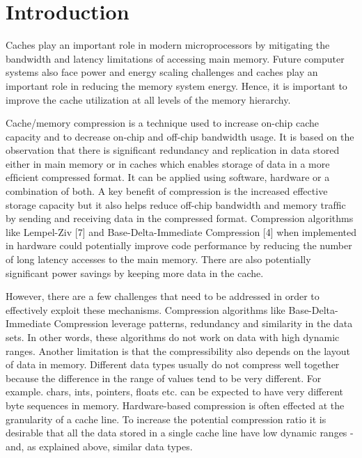 \section{Introduction}
\label{sec:intro}

Caches play an important role in modern microprocessors by mitigating the
bandwidth and latency limitations of accessing main memory. Future computer
systems also face power and energy scaling challenges and caches play an
important role in reducing the memory system energy. Hence, it is important to
improve the cache utilization at all levels of the memory hierarchy. 

Cache/memory compression is a technique used to increase on-chip cache capacity
and to decrease on-chip and off-chip bandwidth usage. It is based on the
observation that there is signiﬁcant redundancy and replication in data stored
either in main memory or in caches which enables storage of data in a more
efﬁcient compressed format. It can be applied using software, hardware or a
combination of both. A key beneﬁt of compression is the increased effective
storage capacity but it also helps reduce off-chip bandwidth and memory trafﬁc
by sending and receiving data in the compressed format. Compression algorithms
like Lempel-Ziv [7] and Base-Delta-Immediate Compression [4] when implemented in
hardware could potentially improve code performance by reducing the number of
long latency accesses to the main memory. There are also potentially significant
power savings by keeping more data in the cache. 

However, there are a few challenges that need to be addressed in order to
effectively exploit these mechanisms. Compression algorithms like
Base-Delta-Immediate Compression leverage patterns, redundancy and similarity in
the data sets. In other words, these algorithms do not work on data with high
dynamic ranges. Another limitation is that the compressibility also depends on
the layout of data in memory. Different data types usually do not compress well
together because the difference in the range of values tend to be very
different. For example. chars, ints, pointers, floats etc. can be expected to
have very different byte sequences in memory. Hardware-based compression is
often effected at the granularity of a cache line. To increase the potential
compression ratio it is desirable that all the data stored in a single cache
line have low dynamic ranges - and, as explained above, similar data types. 

